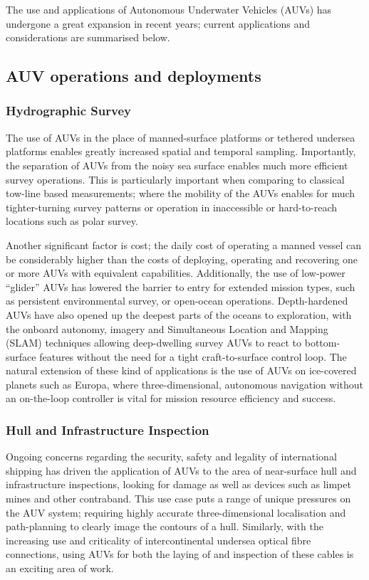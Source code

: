 The use and applications of Autonomous Underwater Vehicles (AUVs) has undergone a great expansion in recent years; current applications and considerations are summarised below.

\subsection{AUV operations and deployments}

\subsubsection{Hydrographic Survey}

The use of AUVs in the place of manned-surface platforms or tethered undersea platforms enables greatly increased spatial and temporal sampling.
Importantly, the separation of AUVs from the noisy sea surface enables much more efficient survey operations.
This is particularly important when comparing to classical tow-line based measurements; where the mobility of the AUVs enables for much tighter-turning survey patterns or operation in inaccessible or hard-to-reach locations such as polar survey\cite{Curtin1993}.

Another significant factor is cost; the daily cost of operating a manned vessel can be considerably higher than the costs of deploying, operating and recovering one or more AUVs with equivalent capabilities\cite{Nicholson2008}.
Additionally, the use of low-power ``glider'' AUVs has lowered the barrier to entry for extended mission types, such as persistent environmental survey, or open-ocean operations. 
Depth-hardened AUVs have also opened up the deepest parts of the oceans to exploration, with the onboard autonomy, imagery and Simultaneous Location and Mapping (SLAM) techniques allowing deep-dwelling survey AUVs to react to bottom-surface features without the need for a tight craft-to-surface control loop.
The natural extension of these kind of applications is the use of AUVs on ice-covered planets such as Europa, where three-dimensional, autonomous navigation without an on-the-loop controller is vital for mission resource efficiency and success.

\subsubsection{Hull and Infrastructure Inspection}
Ongoing concerns regarding the security, safety and legality of international shipping has driven the application of AUVs to the area of near-surface hull and infrastructure inspections, looking for damage as well as devices such as limpet mines and other contraband.
This use case puts a range of unique pressures on the AUV system; requiring highly accurate three-dimensional localisation and path-planning to clearly image the contours of a hull\cite{Nicholson2008}.
Similarly, with the increasing use and criticality of intercontinental undersea optical fibre connections, using AUVs for both the laying of and inspection of these cables is an exciting area of work\cite{Yu2004}\cite{Asakawa2002}.

